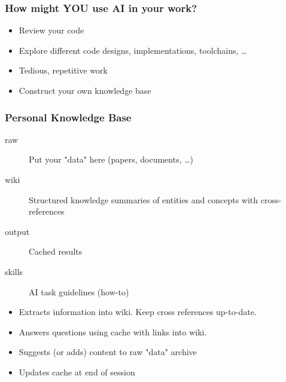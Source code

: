 \documentclass[aspectratio=169,hyperref=colorlinks]{beamer}
\begin{document}
\begin{frame}
  \frametitle{How might YOU use AI in your work?}

  \begin{itemize}
  \item Review your code
  \item Explore different code designs, implementations, toolchains, \ldots
  \item Tedious, repetitive work
  \item Construct your own knowledge base
  \end{itemize}
\end{frame}


\begin{frame}[t]
  \frametitle{Personal Knowledge Base}


  \vfill

  \begin{itemize}
    \begin{description}
    \item[{\ttfamily raw}] Put your "data" here (papers, documents, \dots)
    \item[{\ttfamily wiki}] Structured knowledge summaries of entities and concepts with cross-references
    \item[{\ttfamily output}] Cached results
    \item[{\ttfamily skills}] AI task guidelines (how-to)
    \end{description}
    \begin{itemize}
    \item Extracts information into wiki. Keep cross references up-to-date.
    \item Answers questions using cache with links into wiki.
    \item Suggests (or adds) content to raw "data" archive
    \item Updates cache at end of session
    \end{itemize}
  \end{itemize}
\end{frame}
\end{document}

